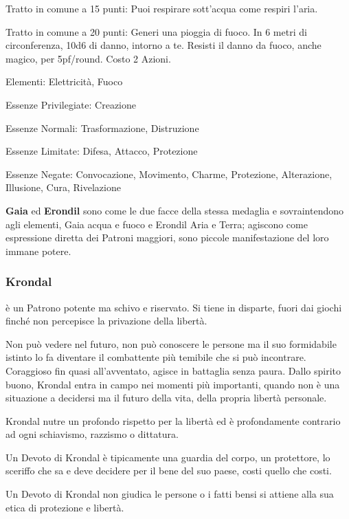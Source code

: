 \documentclass[a4paper,11pt,twoside,openany]{book}
\begin{document}
{Tratto in comune a 15 punti: Puoi respirare sott'acqua come respiri l'aria.

Tratto in comune a 20 punti: Generi una pioggia di fuoco. In 6 metri di circonferenza, 10d6 di danno, intorno a te. Resisti il danno da fuoco, anche magico, per 5pf/round. Costo 2 Azioni.

\bigskip

Elementi: Elettricità, Fuoco

\bigskip

Essenze Privilegiate: Creazione

Essenze Normali: Trasformazione, Distruzione

Essenze Limitate: Difesa, Attacco, Protezione

Essenze Negate: Convocazione, Movimento, Charme, Protezione, Alterazione, Illusione, Cura, Rivelazione

\bigskip

\textbf{Gaia} ed \textbf{Erondil} sono come le due facce della stessa medaglia e sovraintendono agli elementi, Gaia acqua e fuoco e Erondil Aria e Terra; agiscono come espressione diretta dei Patroni maggiori, sono piccole manifestazione del loro immane potere.

\subsubsection{Krondal}

\label{krondal}

è un Patrono potente ma schivo e riservato. Si tiene in disparte, fuori dai giochi finché non percepisce la privazione della libertà.

Non può vedere nel futuro, non può conoscere le persone ma il suo formidabile istinto lo fa diventare il combattente più temibile che si può incontrare. Coraggioso fin quasi all'avventato, agisce in battaglia senza paura. Dallo spirito buono, Krondal entra in campo nei momenti più importanti, quando non è una situazione a decidersi ma il futuro della vita, della propria libertà personale.

Krondal nutre un profondo rispetto per la libertà ed è profondamente contrario ad ogni schiavismo, razzismo o dittatura.

Un Devoto di Krondal è tipicamente una guardia del corpo, un protettore, lo sceriffo che sa e deve decidere per il bene del suo paese, costi quello che costi. 

Un Devoto di Krondal non giudica le persone o i fatti bensi si attiene alla sua etica di protezione e libertà.

}
\end{document}
